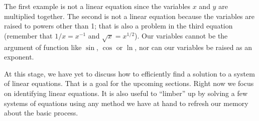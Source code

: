 The first example is not a linear equation since the variables $x$ and $y$ are multiplied together. The second is not a linear equation because the variables are raised to powers other than 1; that is also a problem in the third equation (remember that $1/x = x^{-1}$ and $\sqrt{x} = x^{1/2}$). Our variables cannot be the argument of function like $\sin$, $\cos$ or $\ln$, nor can our variables be raised as an exponent. 

At this stage, we have yet to discuss how to efficiently find a solution to a system of linear equations. That is a goal for the upcoming sections. Right now we focus on identifying linear equations. It is also useful to ``limber'' up by solving a few systems of equations using any method we have at hand to refresh our memory about the basic process.\\





